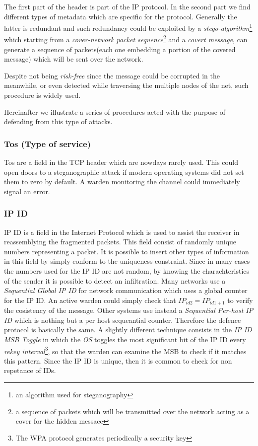 \documentclass[../../main.tex]{subfiles}
\begin{document}
The first part of the header is part of the IP protocol.
In the second part we find different types of metadata which
are specific for the protocol. Generally the latter is redundant and such redundancy
could be exploited by a \emph{stego-algorithm}\footnote{an
algorithm used for steganography} which starting from a \emph{cover-network
packet sequence}\footnote{a sequence of packets which will be transmitted
over the network acting as a cover for the hidden messace} and a
\emph{covert message}, can generate a sequence of packets(each one embedding
a portion of the covered message) which will be sent over the network.

Despite not being \emph{risk-free} since the message could be corrupted in the meanwhile, or even detected
while traversing the multiple nodes of the net, such procedure is widely used.

Hereinafter we illustrate a series of procedures acted with the purpose of defending from this type of attacks.

\subsubsection{Tos (Type of service)}
Tos are a field in the TCP header which
are nowdays rarely used. This could open doors to a steganographic attack if
modern operating systems did not set them to zero by default.
A warden monitoring the channel could immediately signal an error.

\subsubsection{IP ID} IP ID is a field in the Internet Protocol which is used to
assist the receiver in reassemblying the fragmented packets.
This field consist of randomly unique numbers representing a packet.
It is possible to insert other types of information in this field by simply
conform to the uniqueness constraint.
Since in many cases the numbers used for the IP ID are not random, by
knowing the charachteristics of the sender it is possible to detect an
infiltration. Many networks use a \emph{Sequential Global IP ID} for network communication which uses a global counter for the
IP ID. An active warden could simply check that $IP_{id2} = IP_{id1+1}$ to verify the cosistency of the message. Other systems use instead a \emph{Sequential Per-host IP ID} which is nothing but a per host sequeantial counter. 
Therefore the defence protocol is basically the same. A slightly different technique consists in the \emph{IP ID MSB Toggle} in which the \emph{OS} toggles the most significant bit of the IP ID every \emph{rekey interval}\footnote{The WPA protocol generates periodically a security key},
so that the warden can examine the MSB to check if it matches this pattern. Since the IP ID is unique, then it is common to check for non repetance of IDs.
\end{document}
